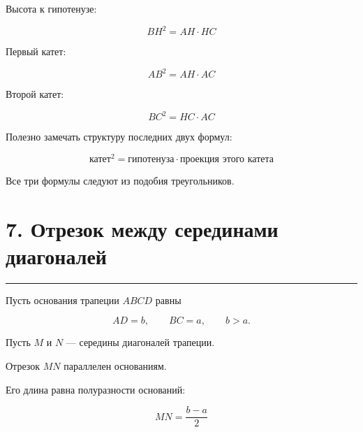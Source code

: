 \documentclass[a4paper,12pt]{article}
\newcommand{\sectionline}{
  \par
  \vspace{0.2em}
  {\color{accent}\hrule height 0.8pt}
  \vspace{0.7em}
}
\newcommand{\formula}[1]{
  \[
  \boxed{#1}
  \]
}
\begin{document}
\begin{center}
\end{center}

Высота к гипотенузе:

\formula{
BH^2=AH\cdot HC
}

Первый катет:

\formula{
AB^2=AH\cdot AC
}

Второй катет:

\formula{
BC^2=HC\cdot AC
}

Полезно замечать структуру последних двух формул:

\[
\boxed{
\text{катет}^2
=
\text{гипотенуза}
\cdot
\text{проекция этого катета}
}
\]

Все три формулы следуют из подобия треугольников.


\section*{7. Отрезок между серединами диагоналей}
\sectionline

Пусть основания трапеции $ABCD$ равны

\[
AD=b,
\qquad
BC=a,
\qquad
b>a.
\]

Пусть $M$ и $N$ --- середины диагоналей трапеции.

Отрезок $MN$ параллелен основаниям.

Его длина равна полуразности оснований:

\formula{
MN=\frac{b-a}{2}
}
\end{document}
